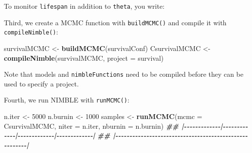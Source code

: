 \documentclass[
  12pt,
]{krantz}
\newenvironment{Shaded}{\begin{snugshade}}{\end{snugshade}}
\newcommand{\AttributeTok}[1]{\textcolor[rgb]{0.13,0.29,0.53}{#1}}
\newcommand{\DecValTok}[1]{\textcolor[rgb]{0.00,0.00,0.81}{#1}}
\newcommand{\DocumentationTok}[1]{\textcolor[rgb]{0.56,0.35,0.01}{\textbf{\textit{#1}}}}
\newcommand{\FunctionTok}[1]{\textcolor[rgb]{0.13,0.29,0.53}{\textbf{#1}}}
\newcommand{\NormalTok}[1]{#1}
\newcommand{\OtherTok}[1]{\textcolor[rgb]{0.56,0.35,0.01}{#1}}
\newcommand{\SpecialCharTok}[1]{\textcolor[rgb]{0.81,0.36,0.00}{\textbf{#1}}}
\newcommand{\StringTok}[1]{\textcolor[rgb]{0.31,0.60,0.02}{#1}}
\begin{document}
To monitor \texttt{lifespan} in addition to \texttt{theta}, you write:

\begin{Shaded}
\end{Shaded}

Third, we create a MCMC function with \texttt{buildMCMC()} and compile it with \texttt{compileNimble()}:

\begin{Shaded}
\begin{Highlighting}[]
\NormalTok{survivalMCMC }\OtherTok{\textless{}{-}} \FunctionTok{buildMCMC}\NormalTok{(survivalConf)}
\NormalTok{CsurvivalMCMC }\OtherTok{\textless{}{-}} \FunctionTok{compileNimble}\NormalTok{(survivalMCMC, }\AttributeTok{project =}\NormalTok{ survival)}
\end{Highlighting}
\end{Shaded}

Note that models and \texttt{nimbleFunctions} need to be compiled before they can be used to specify a project.

Fourth, we run NIMBLE with \texttt{runMCMC()}:

\begin{Shaded}
\begin{Highlighting}[]
\NormalTok{n.iter }\OtherTok{\textless{}{-}} \DecValTok{5000}
\NormalTok{n.burnin }\OtherTok{\textless{}{-}} \DecValTok{1000}
\NormalTok{samples }\OtherTok{\textless{}{-}} \FunctionTok{runMCMC}\NormalTok{(}\AttributeTok{mcmc =}\NormalTok{ CsurvivalMCMC, }
                   \AttributeTok{niter =}\NormalTok{ n.iter,}
                   \AttributeTok{nburnin =}\NormalTok{ n.burnin)}
\DocumentationTok{\#\# |{-}{-}{-}{-}{-}{-}{-}{-}{-}{-}{-}{-}{-}|{-}{-}{-}{-}{-}{-}{-}{-}{-}{-}{-}{-}{-}|{-}{-}{-}{-}{-}{-}{-}{-}{-}{-}{-}{-}{-}|{-}{-}{-}{-}{-}{-}{-}{-}{-}{-}{-}{-}{-}|}
\DocumentationTok{\#\# |{-}{-}{-}{-}{-}{-}{-}{-}{-}{-}{-}{-}{-}{-}{-}{-}{-}{-}{-}{-}{-}{-}{-}{-}{-}{-}{-}{-}{-}{-}{-}{-}{-}{-}{-}{-}{-}{-}{-}{-}{-}{-}{-}{-}{-}{-}{-}{-}{-}{-}{-}{-}{-}{-}{-}|}
\end{Highlighting}
\end{Shaded}
\end{document}
